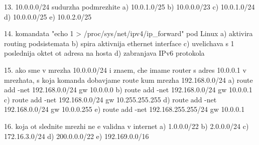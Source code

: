 \begin{questions}
13. 10.0.0.0/24 sudurzha podmrezhite
a) 10.0.1.0/25
b) 10.0.0.0/23
c) 10.0.1.0/24
d) 10.0.0.0/25
e) 10.0.2.0/25

14. komandata "echo 1 > /proc/sys/net/ipv4/ip_forward" pod Linux
a) aktivira routing podsistemata
b) spira aktivnija ethernet interface
c) uvelichava s 1 poslednija oktet ot adresa na hosta
d) zabranjava IPv6 protokola

15. ako sme v mrezha 10.0.0.0/24 i znaem, che imame router s adres 10.0.0.1 v mrezhata, s koja komanda dobavjame route kum mrezha 192.168.0.0/24
a) route add -net 192.168.0.0/24 gw 10.0.0.0
b) route add -net 192.168.0.0/24 gw 10.0.0.1
c) route add -net 192.168.0.0/24 gw 10.255.255.255
d) route add -net 192.168.0.0/24 gw 10.0.0.255
e) route add -net 192.168.255.255/24 gw 10.0.0.1

16. koja ot slednite mrezhi ne e validna v internet
a) 1.0.0.0/22
b) 2.0.0.0/24
c) 172.16.3.0/24
d) 200.0.0.0/22
e) 192.169.0.0/16

\end{questions}

